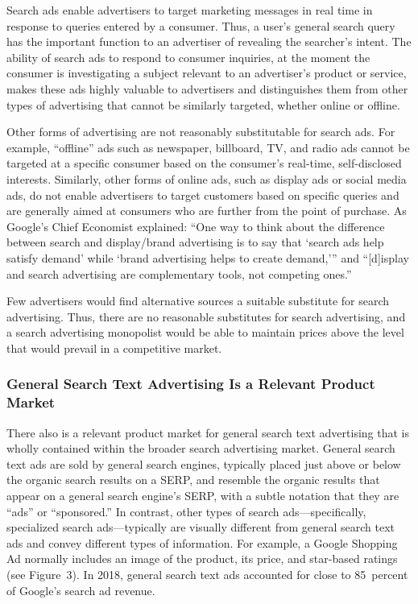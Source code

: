 \documentclass[11pt,b5paper,headings=small]{scrartcl}
\begin{document}

Search ads enable advertisers to target marketing messages in real time in
response to queries entered by a consumer. Thus, a user’s general search query has the important
function to an advertiser of revealing the searcher’s intent. The ability of search ads to respond to
consumer inquiries, at the moment the consumer is investigating a subject relevant to an
advertiser’s product or service, makes these ads highly valuable to advertisers and distinguishes
them from other types of advertising that cannot be similarly targeted, whether online or offline.


Other forms of advertising are not reasonably substitutable for search ads. For
example, “offline” ads such as newspaper, billboard, TV, and radio ads cannot be targeted at a
specific consumer based on the consumer’s real-time, self-disclosed interests. Similarly, other
forms of online ads, such as display ads or social media ads, do not enable advertisers to target
customers based on specific queries and are generally aimed at consumers who are further from
the point of purchase. As Google’s Chief Economist explained: “One way to think about the
difference between search and display/brand advertising is to say that ‘search ads help satisfy
demand’ while ‘brand advertising helps to create demand,’” and “[d]isplay and search
advertising are complementary tools, not competing ones.”


Few advertisers would find alternative sources a suitable substitute for search
advertising. Thus, there are no reasonable substitutes for search advertising, and a search
advertising monopolist would be able to maintain prices above the level that would prevail in a
competitive market.




\subsubsection{General Search Text Advertising Is a Relevant Product Market}
There also is a relevant product market for general search text advertising that is
wholly contained within the broader search advertising market. General search text ads are sold
by general search engines, typically placed just above or below the organic search results on a
SERP, and resemble the organic results that appear on a general search engine’s SERP, with a
subtle notation that they are “ads” or “sponsored.” In contrast, other types of search 
ads---specifically, specialized search ads---typically are visually different from general search text ads
and convey different types of information. For example, a Google Shopping Ad normally
includes an image of the product, its price, and star-based ratings (see Figure~3). In 2018, general
search text ads accounted for close to 85~percent of Google’s search ad revenue.
\end{document}
